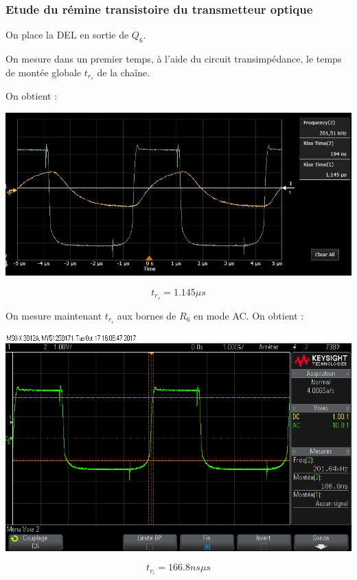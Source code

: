 \documentclass[a4paper]{report}
\begin{document}
\subsubsection{Etude du rémine transistoire du transmetteur optique}

On place la DEL en sortie de $Q_6$.

On mesure dans un premier temps, à l'aide du circuit transimpédance, le temps de montée globale $t_{r_{s}}$ de la chaîne.

On obtient :

\begin{center}
\includegraphics[width=1\textwidth]{trs.JPG}
\end{center}

$$t_{r_{s}} = 1.145 \mu s$$

On mesure maintenant $t_{r_{i}}$ aux bornes de $R_6$ en mode AC. On obtient :

\begin{center}
\includegraphics[width=1\textwidth]{tri_ac.png}
\end{center}

$$t_{r_{i}} = 166.8 ns \mu s$$
\end{document}
